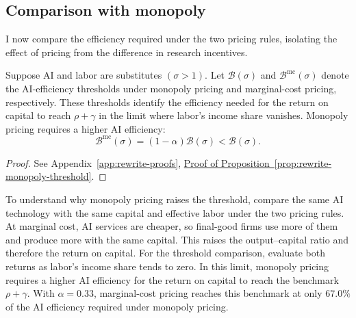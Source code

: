 
\subsection{Comparison with monopoly}
\label{subsec:rewrite-monopoly-threshold}

I now compare the efficiency required under the two pricing rules, isolating the effect of pricing from
the difference in research incentives.

\begin{proposition}
\label{prop:rewrite-monopoly-threshold}
Suppose AI and labor are substitutes $(\sigma>1)$. Let
$\mathcal B(\sigma)$ and $\mathcal B^{\mathrm{mc}}(\sigma)$ denote the
AI-efficiency thresholds under monopoly pricing and marginal-cost
pricing, respectively.
These thresholds identify the efficiency needed for the return on
capital to reach $\rho+\gamma$ in the limit where labor's income share
vanishes. Monopoly pricing requires a higher AI efficiency:
\begin{equation}
 \mathcal B^{\mathrm{mc}}(\sigma)
 =(1-\alpha)\mathcal B(\sigma)<\mathcal B(\sigma).
 \label{eq:rewrite-marginal-cost-threshold}
\end{equation}
\end{proposition}
\begin{proof}
See Appendix~\ref{app:rewrite-proofs},
\hyperref[proof:rewrite-monopoly-threshold]{Proof of
Proposition~\ref*{prop:rewrite-monopoly-threshold}}.
\end{proof}

To understand why monopoly pricing raises the threshold, compare the
same AI technology with the same capital and effective labor under the
two pricing rules. At marginal cost, AI services are cheaper, so final-good
firms use more of them and produce more with the same capital. This raises
the output--capital ratio and therefore the return on capital. For the
threshold comparison, evaluate both returns as labor's income share
tends to zero. In this limit, monopoly pricing requires a higher AI
efficiency for the return on capital to reach the benchmark $\rho+\gamma$.
With $\alpha=0.33$, marginal-cost pricing reaches this benchmark at only
$67.0\%$ of the AI efficiency required under monopoly pricing.

